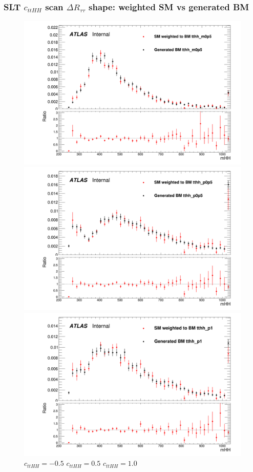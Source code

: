 \documentclass[twoside,11pt]{beamer}
\begin{document}
\begin{frame}
    \frametitle{SLT $c_{ttHH}$ scan $\Delta R_{\tau\tau}$ shape: weighted SM vs generated BM}
\begin{figure}
    \includegraphics[width=.32\textwidth]{figures/Method_B_all_latest/BMtthh_m0p5h_mHH.png}
    \includegraphics[width=.32\textwidth]{figures/Method_B_all_latest/BMtthh_p0p5h_mHH.png}
    \includegraphics[width=.32\textwidth]{figures/Method_B_all_latest/BMtthh_p1h_mHH.png}
    $c_{ttHH} = -0.5$ \hspace{5em} $c_{ttHH} = 0.5$\hspace{5em} $c_{ttHH} = 1.0$    
\end{figure}

\end{frame}   
\end{document}
